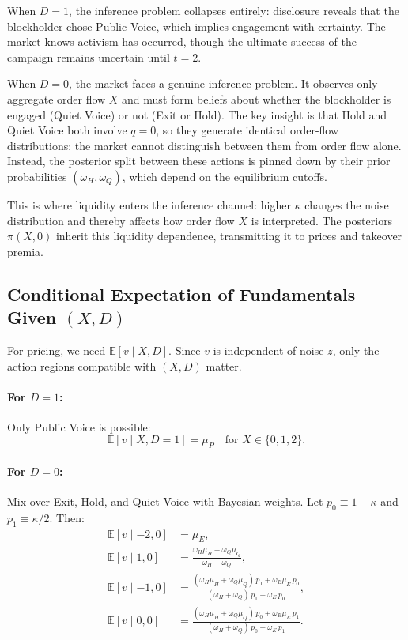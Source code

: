 \documentclass[11pt]{article}
\newcommand{\E}{\mathbb{E}}
\newcommand{\1}{\mathbf{1}}
\begin{document}
When $D=1$, the inference problem collapses entirely: disclosure reveals that the blockholder chose Public Voice, which implies engagement with certainty. The market knows activism has occurred, though the ultimate success of the campaign remains uncertain until $t=2$.

When $D=0$, the market faces a genuine inference problem. It observes only aggregate order flow $X$ and must form beliefs about whether the blockholder is engaged (Quiet Voice) or not (Exit or Hold). The key insight is that Hold and Quiet Voice both involve $q=0$, so they generate identical order-flow distributions; the market cannot distinguish between them from order flow alone. Instead, the posterior split between these actions is pinned down by their prior probabilities $(\omega_H,\omega_Q)$, which depend on the equilibrium cutoffs.

This is where liquidity enters the inference channel: higher $\kappa$ changes the noise distribution and thereby affects how order flow $X$ is interpreted. The posteriors $\pi(X,0)$ inherit this liquidity dependence, transmitting it to prices and takeover premia.

%
\subsection{Conditional Expectation of Fundamentals Given \texorpdfstring{$(X,D)$}{(X,D)}}
%

For pricing, we need $\E[v \mid X, D]$. Since $v$ is independent of noise $z$, only the action regions compatible with $(X, D)$ matter.

\paragraph{For $D=1$:} Only Public Voice is possible:
\[
\E[v \mid X, D=1] = \mu_P \quad \text{for } X \in \{0, 1, 2\}.
\]

\paragraph{For $D=0$:} Mix over Exit, Hold, and Quiet Voice with Bayesian weights. Let $p_0 \equiv 1 - \kappa$ and $p_1 \equiv \kappa/2$. Then:
\begin{align*}
\E[v \mid -2, 0] &= \mu_E, \\
\E[v \mid 1, 0] &= \frac{\omega_H \mu_H + \omega_Q \mu_Q}{\omega_H + \omega_Q}, \\
\E[v \mid -1, 0] &= \frac{(\omega_H \mu_H + \omega_Q \mu_Q) \, p_1 + \omega_E \mu_E \, p_0}{(\omega_H + \omega_Q) \, p_1 + \omega_E \, p_0}, \\
\E[v \mid 0, 0] &= \frac{(\omega_H \mu_H + \omega_Q \mu_Q) \, p_0 + \omega_E \mu_E \, p_1}{(\omega_H + \omega_Q) \, p_0 + \omega_E \, p_1}.
\end{align*}
\end{document}
